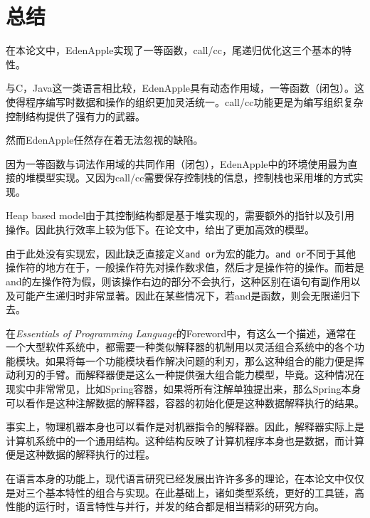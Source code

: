 \chapter*{总结}
\thispagestyle{hubu@thesis}

在本论文中，EdenApple实现了一等函数，call/cc，尾递归优化这三个基本的特性。

与C，Java这一类语言相比较，EdenApple具有动态作用域，一等函数（闭包）。这使得程序编写时数据和操作的组织更加灵活统一。call/cc功能更是为编写组织复杂控制结构提供了强有力的武器。

然而EdenApple任然存在着无法忽视的缺陷。

因为一等函数与词法作用域的共同作用（闭包），EdenApple中的环境使用最为直接的堆模型实现。又因为call/cc需要保存控制栈的信息，控制栈也采用堆的方式实现。

Heap based model由于其控制结构都是基于堆实现的，需要额外的指针以及引用操作。因此执行效率上较为低下。在论文\cite{dybvig87timpl}中，给出了更加高效的模型。

由于此处没有实现宏，因此缺乏直接定义\texttt{and or}为宏的能力。\texttt{and or}不同于其他操作符的地方在于，一般操作符先对操作数求值，然后才是操作符的操作。而若是and的左操作符为假，则该操作右边的部分不会执行，这种区别在语句有副作用以及可能产生递归时非常显著。因此在某些情况下，若and是函数，则会无限递归下去。

在\textit{Essentials of Programming Language\cite{friedman2001eopl}}的Foreword中，有这么一个描述，通常在一个大型软件系统中，都需要一种类似解释器的机制用以灵活组合系统中的各个功能模块。如果将每一个功能模块看作解决问题的利刃，那么这种组合的能力便是挥动利刃的手臂。而解释器便是这么一种提供强大组合能力模型，毕竟。这种情况在现实中非常常见，比如Spring容器，如果将所有注解单独提出来，那么Spring本身可以看作是这种注解数据的解释器，容器的初始化便是这种数据解释执行的结果。
%

事实上，物理机器本身也可以看作是对机器指令的解释器。因此，解释器实际上是计算机系统中的一个通用结构。这种结构反映了计算机程序本身也是数据，而计算便是这种数据的解释执行的过程。

在语言本身的功能上，现代语言研究已经发展出许许多多的理论，在本论文中仅仅是对三个基本特性的组合与实现。在此基础上，诸如类型系统，更好的工具链，高性能的运行时，语言特性与并行，并发的结合都是相当精彩的研究方向。